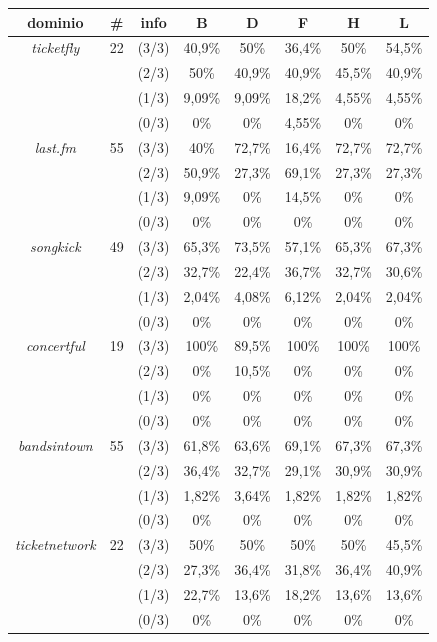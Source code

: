 \documentclass[a4paper]{report}
\begin{document}
\begin{tabular}{|cccccccc|}
\hline
dominio & \# & info & B & D & F & H & L \\
\hline
\textit{ticketfly} &22& (3/3) & 40,9\%& 50\%& 36,4\%& 50\%& 54,5\% \\
& & (2/3) & 50\%& 40,9\%& 40,9\%& 45,5\%& 40,9\% \\
& & (1/3) & 9,09\%& 9,09\%& 18,2\%& 4,55\%& 4,55\% \\
& & (0/3) & 0\%& 0\%& 4,55\%& 0\%& 0\% \\
\hline
\textit{last.fm} &55& (3/3) & 40\%& 72,7\%& 16,4\%& 72,7\%& 72,7\% \\
& & (2/3) & 50,9\%& 27,3\%& 69,1\%& 27,3\%& 27,3\% \\
& & (1/3) & 9,09\%& 0\%& 14,5\%& 0\%& 0\% \\
& & (0/3) & 0\%& 0\%& 0\%& 0\%& 0\% \\
\hline
\textit{songkick} &49& (3/3) & 65,3\%& 73,5\%& 57,1\%& 65,3\%& 67,3\% \\
& & (2/3) & 32,7\%& 22,4\%& 36,7\%& 32,7\%& 30,6\% \\
& & (1/3) & 2,04\%& 4,08\%& 6,12\%& 2,04\%& 2,04\% \\
& & (0/3) & 0\%& 0\%& 0\%& 0\%& 0\% \\
\hline
\textit{concertful} &19& (3/3) & 100\%& 89,5\%& 100\%& 100\%& 100\% \\
& & (2/3) & 0\%& 10,5\%& 0\%& 0\%& 0\% \\
& & (1/3) & 0\%& 0\%& 0\%& 0\%& 0\% \\
& & (0/3) & 0\%& 0\%& 0\%& 0\%& 0\% \\
\hline
\textit{bandsintown} &55& (3/3) & 61,8\%& 63,6\%& 69,1\%& 67,3\%& 67,3\% \\
& & (2/3) & 36,4\%& 32,7\%& 29,1\%& 30,9\%& 30,9\% \\
& & (1/3) & 1,82\%& 3,64\%& 1,82\%& 1,82\%& 1,82\% \\
& & (0/3) & 0\%& 0\%& 0\%& 0\%& 0\% \\
\hline
\textit{ticketnetwork} &22& (3/3) & 50\%& 50\%& 50\%& 50\%& 45,5\% \\
& & (2/3) & 27,3\%& 36,4\%& 31,8\%& 36,4\%& 40,9\% \\
& & (1/3) & 22,7\%& 13,6\%& 18,2\%& 13,6\%& 13,6\% \\
& & (0/3) & 0\%& 0\%& 0\%& 0\%& 0\% \\
\hline
\end{tabular}
\end{document}
